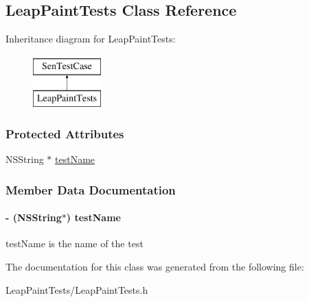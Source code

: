 \hypertarget{interface_leap_paint_tests}{\subsection{Leap\-Paint\-Tests Class Reference}
\label{d6/d93/interface_leap_paint_tests}
}
Inheritance diagram for Leap\-Paint\-Tests\-:\begin{figure}[H]
\begin{center}
\leavevmode
\includegraphics[height=2.000000cm]{d6/d93/interface_leap_paint_tests}
\end{center}
\end{figure}
\subsubsection*{Protected Attributes}
\begin{DoxyCompactItemize}
\item 
N\-S\-String $\ast$ \hyperlink{interface_leap_paint_tests_a4054bd06a08b6dfd4b203645dab36bbc}{test\-Name}
\end{DoxyCompactItemize}


\subsubsection{Member Data Documentation}
\hypertarget{interface_leap_paint_tests_a4054bd06a08b6dfd4b203645dab36bbc}{
\paragraph[{test\-Name}]{\setlength{\rightskip}{0pt plus 5cm}-\/ (N\-S\-String$\ast$) test\-Name\hspace{0.3cm}{\ttfamily [protected]}}}\label{d6/d93/interface_leap_paint_tests_a4054bd06a08b6dfd4b203645dab36bbc}
test\-Name is the name of the test 

The documentation for this class was generated from the following file\-:\begin{DoxyCompactItemize}
\item 
Leap\-Paint\-Tests/Leap\-Paint\-Tests.\-h\end{DoxyCompactItemize}
